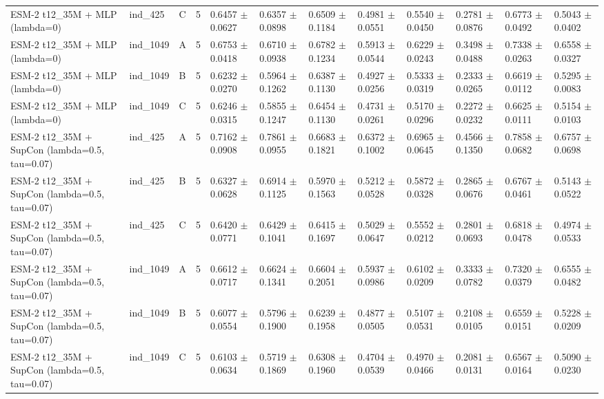 \begin{table}[ht]
\begin{tabular}{llllllllllll}
ESM-2 t12\_35M + MLP (lambda=0) & ind\_425 & C & 5 & 0.6457 $\pm$ 0.0627 & 0.6357 $\pm$ 0.0898 & 0.6509 $\pm$ 0.1184 & 0.4981 $\pm$ 0.0551 & 0.5540 $\pm$ 0.0450 & 0.2781 $\pm$ 0.0876 & 0.6773 $\pm$ 0.0492 & 0.5043 $\pm$ 0.0402 \\
ESM-2 t12\_35M + MLP (lambda=0) & ind\_1049 & A & 5 & 0.6753 $\pm$ 0.0418 & 0.6710 $\pm$ 0.0938 & 0.6782 $\pm$ 0.1234 & 0.5913 $\pm$ 0.0544 & 0.6229 $\pm$ 0.0243 & 0.3498 $\pm$ 0.0488 & 0.7338 $\pm$ 0.0263 & 0.6558 $\pm$ 0.0327 \\
ESM-2 t12\_35M + MLP (lambda=0) & ind\_1049 & B & 5 & 0.6232 $\pm$ 0.0270 & 0.5964 $\pm$ 0.1262 & 0.6387 $\pm$ 0.1130 & 0.4927 $\pm$ 0.0256 & 0.5333 $\pm$ 0.0319 & 0.2333 $\pm$ 0.0265 & 0.6619 $\pm$ 0.0112 & 0.5295 $\pm$ 0.0083 \\
ESM-2 t12\_35M + MLP (lambda=0) & ind\_1049 & C & 5 & 0.6246 $\pm$ 0.0315 & 0.5855 $\pm$ 0.1247 & 0.6454 $\pm$ 0.1130 & 0.4731 $\pm$ 0.0261 & 0.5170 $\pm$ 0.0296 & 0.2272 $\pm$ 0.0232 & 0.6625 $\pm$ 0.0111 & 0.5154 $\pm$ 0.0103 \\
ESM-2 t12\_35M + SupCon (lambda=0.5, tau=0.07) & ind\_425 & A & 5 & 0.7162 $\pm$ 0.0908 & 0.7861 $\pm$ 0.0955 & 0.6683 $\pm$ 0.1821 & 0.6372 $\pm$ 0.1002 & 0.6965 $\pm$ 0.0645 & 0.4566 $\pm$ 0.1350 & 0.7858 $\pm$ 0.0682 & 0.6757 $\pm$ 0.0698 \\
ESM-2 t12\_35M + SupCon (lambda=0.5, tau=0.07) & ind\_425 & B & 5 & 0.6327 $\pm$ 0.0628 & 0.6914 $\pm$ 0.1125 & 0.5970 $\pm$ 0.1563 & 0.5212 $\pm$ 0.0528 & 0.5872 $\pm$ 0.0328 & 0.2865 $\pm$ 0.0676 & 0.6767 $\pm$ 0.0461 & 0.5143 $\pm$ 0.0522 \\
ESM-2 t12\_35M + SupCon (lambda=0.5, tau=0.07) & ind\_425 & C & 5 & 0.6420 $\pm$ 0.0771 & 0.6429 $\pm$ 0.1041 & 0.6415 $\pm$ 0.1697 & 0.5029 $\pm$ 0.0647 & 0.5552 $\pm$ 0.0212 & 0.2801 $\pm$ 0.0693 & 0.6818 $\pm$ 0.0478 & 0.4974 $\pm$ 0.0533 \\
ESM-2 t12\_35M + SupCon (lambda=0.5, tau=0.07) & ind\_1049 & A & 5 & 0.6612 $\pm$ 0.0717 & 0.6624 $\pm$ 0.1341 & 0.6604 $\pm$ 0.2051 & 0.5937 $\pm$ 0.0986 & 0.6102 $\pm$ 0.0209 & 0.3333 $\pm$ 0.0782 & 0.7320 $\pm$ 0.0379 & 0.6555 $\pm$ 0.0482 \\
ESM-2 t12\_35M + SupCon (lambda=0.5, tau=0.07) & ind\_1049 & B & 5 & 0.6077 $\pm$ 0.0554 & 0.5796 $\pm$ 0.1900 & 0.6239 $\pm$ 0.1958 & 0.4877 $\pm$ 0.0505 & 0.5107 $\pm$ 0.0531 & 0.2108 $\pm$ 0.0105 & 0.6559 $\pm$ 0.0151 & 0.5228 $\pm$ 0.0209 \\
ESM-2 t12\_35M + SupCon (lambda=0.5, tau=0.07) & ind\_1049 & C & 5 & 0.6103 $\pm$ 0.0634 & 0.5719 $\pm$ 0.1869 & 0.6308 $\pm$ 0.1960 & 0.4704 $\pm$ 0.0539 & 0.4970 $\pm$ 0.0466 & 0.2081 $\pm$ 0.0131 & 0.6567 $\pm$ 0.0164 & 0.5090 $\pm$ 0.0230 \\

\end{tabular}
\end{table}
